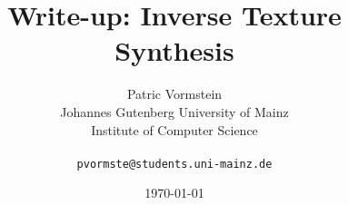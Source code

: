 \title{Write-up: Inverse Texture Synthesis} 
\author{Patric Vormstein\\
 Johannes Gutenberg University of Mainz\\
 Institute of Computer Science\\
 \\
 \texttt{pvormste@students.uni-mainz.de}}
\date{\today} 
\maketitle
